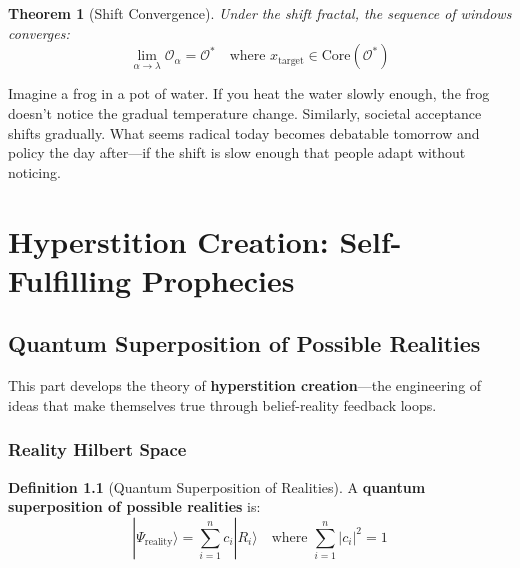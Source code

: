 \documentclass[11pt,twoside]{book}
\newcommand{\Overton}{\mathcal{O}}
\theoremstyle{definition}
\newtheorem{definition}{Definition}[chapter]
\theoremstyle{plain}
\newtheorem{theorem}[definition]{Theorem}
\theoremstyle{remark}
\begin{document}
\begin{theorem}[Shift Convergence]
Under the shift fractal, the sequence of windows converges:
\[
    \lim_{\alpha \to \lambda} \Overton_\alpha = \Overton^*
    \quad \text{where } x_{\mathrm{target}} \in \mathrm{Core}(\Overton^*)
\]
\end{theorem}

\begin{tcolorbox}[colback=green!5!white,colframe=green!65!black,title=\textbf{Plain English: The ``Boiling Frog'' Metaphor},breakable]
Imagine a frog in a pot of water. If you heat the water slowly enough, the frog doesn't notice the gradual temperature change. Similarly, societal acceptance shifts gradually. What seems radical today becomes debatable tomorrow and policy the day after---if the shift is slow enough that people adapt without noticing.
\end{tcolorbox}

\part{Hyperstition Creation: Self-Fulfilling Prophecies}

\chapter{Quantum Superposition of Possible Realities}
\label{ch:hyperstition-creation}

\begin{tcolorbox}[colback=blue!5!white,colframe=blue!75!black,title=\textbf{Chapter Overview}]
This part develops the theory of \textbf{hyperstition creation}---the engineering of ideas that make themselves true through belief-reality feedback loops.
\end{tcolorbox}

\section{Reality Hilbert Space}

\begin{definition}[Quantum Superposition of Realities]
A \textbf{quantum superposition of possible realities} is:
\begin{equation}
\boxed{
|\Psi_{\text{reality}}\rangle = \sum_{i=1}^{n} c_i |R_i\rangle \quad \text{where } \sum_{i=1}^{n} |c_i|^2 = 1
}
\end{equation}
\end{definition}
\end{document}
